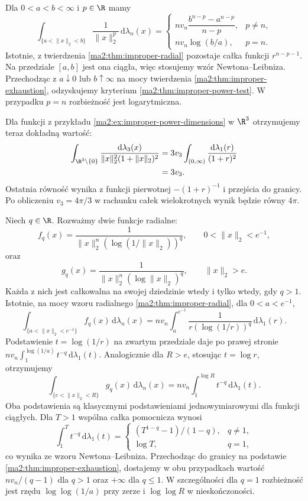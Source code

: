 \begin{przyklad}
\label{ma2:ex:improper-radial-power}
Dla $0<a<b<\infty$ i $p\in\R$ mamy
\[
 \int_{\{a<\|x\|_2<b\}}\frac{1}{\|x\|_2^p}\,
 \mathrm d\lambda_n(x)
 =
 \begin{cases}
 nv_n\dfrac{b^{n-p}-a^{n-p}}{n-p},&p\ne n,\\[6pt]
 nv_n\log(b/a),&p=n.
 \end{cases}
\]
Istotnie, z twierdzenia \ref{ma2:thm:improper-radial}
pozostaje całka funkcji $r^{n-p-1}$.
Na przedziale $[a,b]$ jest ona ciągła, więc
stosujemy wzór Newtona--Leibniza.
Przechodząc z $a\downarrow0$ lub $b\uparrow\infty$
na mocy twierdzenia \ref{ma2:thm:improper-exhaustion},
odzyskujemy kryterium \ref{ma2:thm:improper-power-test}.
W przypadku $p=n$ rozbieżność jest logarytmiczna.

Dla funkcji z przykładu
\ref{ma2:ex:improper-power-dimensions} w $\R^3$
otrzymujemy teraz dokładną wartość:
\[
 \begin{aligned}
 \int_{\R^3\setminus\{0\}}
 \frac{\mathrm d\lambda_3(x)}
 {\|x\|_2^2(1+\|x\|_2)^2}
 &=3v_3\int_{(0,\infty)}
     \frac{\mathrm d\lambda_1(r)}{(1+r)^2}\\
 &=3v_3.
 \end{aligned}
\]
Ostatnia równość wynika z funkcji pierwotnej
$-(1+r)^{-1}$ i przejścia do granicy.
Po obliczeniu $v_3=4\pi/3$ w rachunku
całek wielokrotnych wynik będzie równy $4\pi$.
\end{przyklad}

\begin{przyklad}
\label{ma2:ex:improper-logarithmic-critical}
Niech $q\in\R$. Rozważmy dwie funkcje radialne:
\[
 f_q(x)=\frac{1}{\|x\|_2^n
       (\log(1/\|x\|_2))^q},
 \qquad 0<\|x\|_2<e^{-1},
\]
oraz
\[
 g_q(x)=\frac{1}{\|x\|_2^n
       (\log\|x\|_2)^q},
 \qquad \|x\|_2>e.
\]
Każda z nich jest całkowalna na swojej dziedzinie
wtedy i tylko wtedy, gdy $q>1$.
Istotnie, na mocy wzoru radialnego
\ref{ma2:thm:improper-radial}, dla $0<a<e^{-1}$,
\[
 \int_{\{a<\|x\|_2<e^{-1}\}} f_q(x)\,
 \mathrm d\lambda_n(x)
 =nv_n\int_a^{e^{-1}}\frac{1}{r(\log(1/r))^q}\,
 \mathrm d\lambda_1(r).
\]
Podstawienie $t=\log(1/r)$ na zwartym przedziale
daje po prawej stronie
$nv_n\int_1^{\log(1/a)}t^{-q}\,\mathrm d\lambda_1(t)$.
Analogicznie dla $R>e$, stosując $t=\log r$,
otrzymujemy
\[
 \int_{\{e<\|x\|_2<R\}} g_q(x)\,
 \mathrm d\lambda_n(x)
 =nv_n\int_1^{\log R} t^{-q}\,\mathrm d\lambda_1(t).
\]
Oba podstawienia są klasycznymi podstawieniami
jednowymiarowymi dla funkcji ciągłych.
Dla $T>1$ wspólna całka pomocnicza wynosi
\[
 \int_1^T t^{-q}\,\mathrm d\lambda_1(t)
 =
 \begin{cases}
 (T^{1-q}-1)/(1-q),&q\ne1,\\
 \log T,&q=1,
 \end{cases}
\]
co wynika ze wzoru Newtona--Leibniza.
Przechodząc do granicy na podstawie
\ref{ma2:thm:improper-exhaustion}, dostajemy
w obu przypadkach wartość $nv_n/(q-1)$ dla $q>1$
oraz $+\infty$ dla $q\le1$.
W szczególności dla $q=1$ rozbieżność jest
rzędu $\log\log(1/a)$ przy zerze i
$\log\log R$ w nieskończoności.
\end{przyklad}

